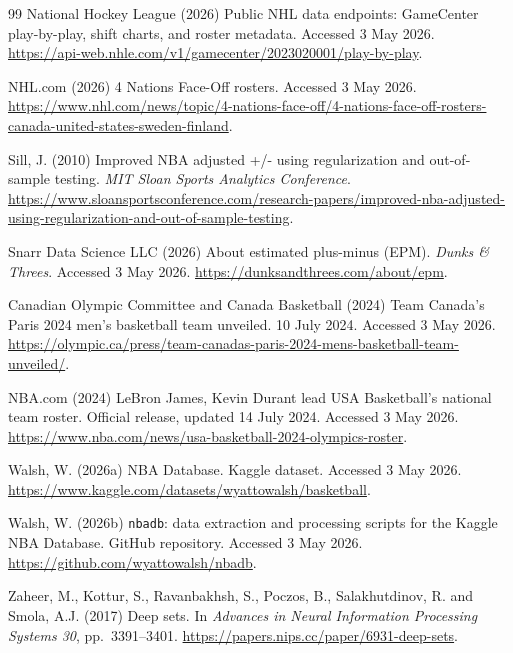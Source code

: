 \documentclass[12pt,letterpaper]{article}
\begin{document}
\begin{thebibliography}{99}
National Hockey League (2026)
Public NHL data endpoints: GameCenter play-by-play, shift charts, and
roster metadata.
Accessed 3 May 2026.
\url{https://api-web.nhle.com/v1/gamecenter/2023020001/play-by-play}.

NHL.com (2026)
4 Nations Face-Off rosters.
Accessed 3 May 2026.
\url{https://www.nhl.com/news/topic/4-nations-face-off/4-nations-face-off-rosters-canada-united-states-sweden-finland}.

Sill, J. (2010)
Improved NBA adjusted +/- using regularization and out-of-sample
testing.
\textit{MIT Sloan Sports Analytics Conference}.
\url{https://www.sloansportsconference.com/research-papers/improved-nba-adjusted-using-regularization-and-out-of-sample-testing}.

Snarr Data Science LLC (2026)
About estimated plus-minus (EPM).
\textit{Dunks \& Threes}.
Accessed 3 May 2026.
\url{https://dunksandthrees.com/about/epm}.

Canadian Olympic Committee and Canada Basketball (2024)
Team Canada's Paris 2024 men's basketball team unveiled.
10 July 2024.
Accessed 3 May 2026.
\url{https://olympic.ca/press/team-canadas-paris-2024-mens-basketball-team-unveiled/}.

NBA.com (2024)
LeBron James, Kevin Durant lead USA Basketball's national team roster.
Official release, updated 14 July 2024.
Accessed 3 May 2026.
\url{https://www.nba.com/news/usa-basketball-2024-olympics-roster}.

Walsh, W. (2026a)
NBA Database.
Kaggle dataset.
Accessed 3 May 2026.
\url{https://www.kaggle.com/datasets/wyattowalsh/basketball}.

Walsh, W. (2026b)
\texttt{nbadb}: data extraction and processing scripts for the Kaggle
NBA Database.
GitHub repository.
Accessed 3 May 2026.
\url{https://github.com/wyattowalsh/nbadb}.

Zaheer, M., Kottur, S., Ravanbakhsh, S., Poczos, B., Salakhutdinov,
R. and Smola, A.J. (2017)
Deep sets.
In \textit{Advances in Neural Information Processing Systems 30},
pp.\ 3391--3401.
\url{https://papers.nips.cc/paper/6931-deep-sets}.

\end{thebibliography}
\end{document}
